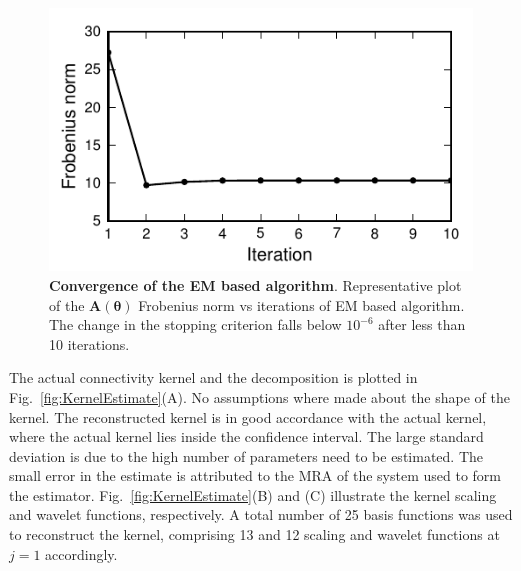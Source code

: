 \documentclass[review,authoryear,3p]{elsarticle}
\begin{document}
\begin{figure}[t]
 	\centering
 		\includegraphics[scale=1]{./Graph/fig8.pdf}
 		\caption{{\bf Convergence of the EM based algorithm}. Representative plot of
the $\mathbf A(\boldsymbol\theta)$ Frobenius norm vs iterations of EM based algorithm. The change in the stopping criterion falls below $10^{-6}$ after less than 10 iterations.} 
\label{fig:MRA-Convergence}  
 \end{figure}     
The actual connectivity kernel and the decomposition is plotted in Fig.~\ref{fig:KernelEstimate}(A). No assumptions where made about the shape of the kernel. The reconstructed kernel is in good accordance with the actual kernel, where the actual kernel lies inside the confidence interval. The large standard deviation is due to the high number of parameters need to be estimated. The small error in the estimate is attributed to the MRA of the system used to form the estimator. Fig.~\ref{fig:KernelEstimate}(B) and (C) illustrate the kernel scaling and wavelet functions, respectively. A total number of 25 basis functions was used to reconstruct the kernel, comprising 13 and 12 scaling and wavelet functions at $j=1$ accordingly. 
\end{document}
